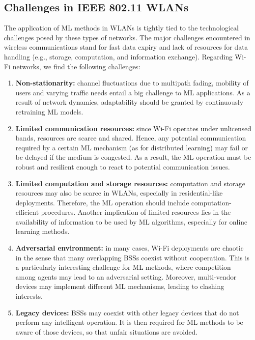 \documentclass[journal]{IEEEtran}
\begin{document}
\subsection{Challenges in IEEE 802.11 WLANs}
\label{section:ieee_80211_wlans}
The application of ML methods in WLANs is tightly tied to the technological challenges posed by these types of networks. The major challenges encountered in wireless communications stand for fast data expiry and lack of resources for data handling (e.g., storage, computation, and information exchange). Regarding Wi-Fi networks, we find the following challenges:
\begin{enumerate}
	\item \textbf{Non-stationarity:} channel fluctuations due to multipath fading, mobility of users and varying traffic needs entail a big challenge to ML applications. As a result of network dynamics, adaptability should be granted by continuously retraining ML models.
	\item \textbf{Limited communication resources:} since Wi-Fi operates under unlicensed bands, resources are scarce and shared. Hence, any potential communication required by a certain ML mechanism (as for distributed learning) may fail or be delayed if the medium is congested. As a result, the ML operation must be robust and resilient enough to react to potential communication issues.
	\item \textbf{Limited computation and storage resources:} computation and storage resources may also be scarce in WLANs, especially in residential-like deployments. Therefore, the ML operation should include computation-efficient procedures. Another implication of limited resources lies in the availability of information to be used by ML algorithms, especially for online learning methods.
	\item \textbf{Adversarial environment:} in many cases, Wi-Fi deployments are chaotic in the sense that many overlapping BSSs coexist without cooperation. This is a particularly interesting challenge for ML methods, where competition among agents may lead to an adversarial setting. Moreover, multi-vendor devices may implement different ML mechanisms, leading to clashing interests.
	\item \textbf{Legacy devices:} BSSs may coexist with other legacy devices that do not perform any intelligent operation. It is then required for ML methods to be aware of those devices, so that unfair situations are avoided.
\end{enumerate}
\end{document}
